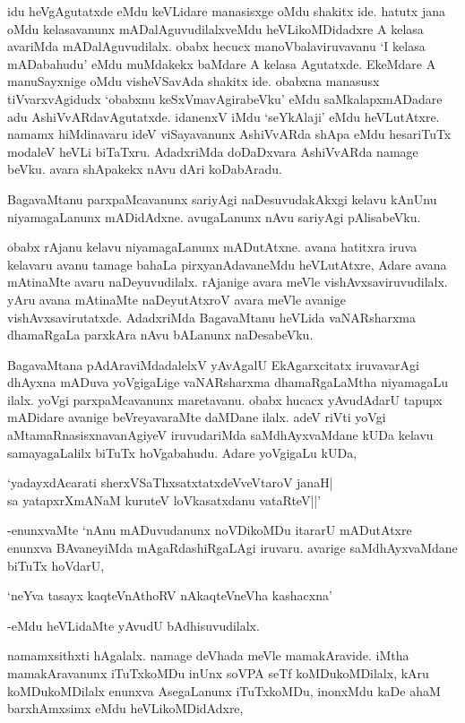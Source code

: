 idu heVgAgutatxde eMdu keVLidare manasisxge oMdu shakitx ide. hatutx jana oMdu kelasavanunx mADalAguvudilalxveMdu heVLikoMDidadxre A kelasa avariMda mADalAguvudilalx. obabx hecucx manoVbalaviruvavanu `I kelasa mADabahudu' eMdu muMdakekx baMdare A kelasa Agutatxde. EkeMdare A manuSayxnige oMdu visheVSavAda shakitx ide. obabxna manasusx tiVvarxvAgidudx `obabxnu keSxVmavAgirabeVku' eMdu saMkalapxmADadare adu AshiVvARdavAgutatxde. idanenxV iMdu `seYkAlaji' eMdu heVLutAtxre. namamx hiMdinavaru ideV viSayavanunx AshiVvARda shApa eMdu hesariTuTx modaleV heVLi biTaTxru. AdadxriMda doDaDxvara AshiVvARda namage beVku. avara shApakekx nAvu dAri koDabAradu.

BagavaMtanu parxpaMcavanunx sariyAgi naDesuvudakAkxgi kelavu kAnUnu niyamagaLanunx mADidAdxne. avugaLanunx nAvu sariyAgi pAlisabeVku.

obabx rAjanu kelavu niyamagaLanunx mADutAtxne. avana hatitxra iruva kelavaru avanu tamage bahaLa pirxyanAdavaneMdu heVLutAtxre, Adare avana mAtinaMte avaru naDeyuvudilalx. rAjanige avara meVle vishAvxsaviruvudilalx. yAru avana mAtinaMte naDeyutAtxroV avara meVle avanige vishAvxsavirutatxde. AdadxriMda BagavaMtanu heVLida vaNARsharxma dhamaRgaLa parxkAra nAvu bALanunx naDesabeVku.

BagavaMtana pAdAraviMdadalelxV yAvAgalU EkAgarxcitatx iruvavarAgi dhAyxna mADuva yoVgigaLige vaNARsharxma dhamaRgaLaMtha niyamagaLu ilalx. yoVgi parxpaMcavanunx maretavanu. obabx hucacx yAvudAdarU tapupx mADidare avanige beVreyavaraMte daMDane ilalx. adeV riVti yoVgi aMtamaRnasisxnavanAgiyeV iruvudariMda saMdhAyxvaMdane kUDa kelavu samayagaLalilx biTuTx hoVgabahudu. Adare yoVgigaLu kUDa,

\begin{shloka}
`yadayxdAcarati sherxVSaThxsatxtatxdeVveVtaroV janaH|\\
sa yatapxrXmANaM kuruteV loVkasatxdanu vataRteV||'
\end{shloka}

-enunxvaMte `nAnu mADuvudanunx noVDikoMDu itararU mADutAtxre enunxva BAvaneyiMda mAgaRdashiRgaLAgi iruvaru. avarige saMdhAyxvaMdane biTuTx hoVdarU,

\begin{shloka}
`neYva tasayx kaqteVnAthoRV nAkaqteVneVha kashacxna'
\end{shloka}

-eMdu heVLidaMte yAvudU bAdhisuvudilalx.

namamxsithxti hAgalalx. namage deVhada meVle mamakAravide. iMtha mamakAravanunx iTuTxkoMDu inUnx soVPA seTf koMDukoMDilalx, kAru koMDukoMDilalx enunxva AsegaLanunx iTuTxkoMDu, inonxMdu kaDe ahaM barxhAmxsimx eMdu heVLikoMDidAdxre, 

